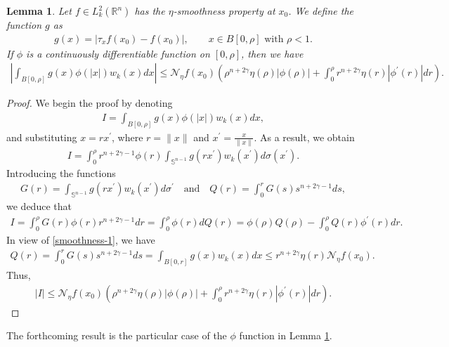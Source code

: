 \documentclass[11pt,a4paper,reqno]{amsproc}
\newtheorem{lemma}[theorem]{Lemma}
\theoremstyle{definition}
\theoremstyle{remark}
\numberwithin{equation}{section}
\begin{document}
\begin{lemma}\label{Lemmma-5-1}
    Let $f \in L_k^2(\mathbb{R}^n)$ has the $\eta$-smoothness property at $x_0$. We define the function $g$ as 
    \begin{align*}
        g(x)= |\tau_xf(x_0)-f(x_0)|, \quad \quad  x \in B[0, \rho] \text{  with  } \rho <1. 
    \end{align*} If $\phi$ is a continuously differentiable function on $[0, \rho]$, then we have
    \begin{align} \label{Inq-1}
       \left| \int_{B[0,\rho]} g(x)\phi(|x|)w_k(x)dx\right| \leq \mathcal{N}_{\eta}f(x_0)\left( \rho^{n+2\gamma}\eta(\rho)|\phi(\rho)|+\int_0^{\rho} r^{n+2\gamma} \eta(r)|\phi^\prime(r)|dr
       \right).
    \end{align}
\end{lemma}
\begin{proof} We begin the proof by
   denoting \begin{align*}
      I= \int_{B[0,\rho]} g(x)\phi(|x|)w_k(x)dx,
  \end{align*}  and substituting $x=rx^\prime$, where $r=\|x\|$ and $x^\prime= \frac{x}{\|x\|}$. As a result, we obtain 
  \begin{align*}
      I= \int_0^\rho r^{n+2\gamma-1} \phi(r)\int_{\mathbb{S}^{n-1}} g(rx^\prime)w_k(x^\prime)d\sigma(x^\prime).
  \end{align*} Introducing the functions
  \begin{align*}
      G(r)=\int_{\mathbb{S}^{n-1}} g(rx^\prime) w_k(x^\prime)d\sigma^\prime \quad \text{and} \quad Q(r)=\int_0^r G(s)s^{n+2\gamma-1}ds,
  \end{align*}we deduce that 
  \begin{align*}
      I= \int_0^\rho G(r)\phi(r)r^{n+2\gamma-1}dr = \int_0^\rho \phi(r)dQ(r)= \phi(\rho)Q(\rho)-\int_0^\rho Q(r)\phi^\prime(r)dr. 
  \end{align*} In view of \eqref{smoothness-1}, we have
\begin{align*}
    Q(r)= \int_0^r G(s)s^{n+2\gamma-1}ds = \int_{B[0,r]} g(x)w_k(x)dx  \leq r^{n+2\gamma }\eta(r)\mathcal{N}_\eta f(x_0).
\end{align*} Thus, 
\begin{align*}
   | I| \leq \mathcal{N}_{\eta}f(x_0)\left( \rho^{n+2\gamma}\eta(\rho)|\phi(\rho)|+\int_0^{\rho} r^{n+2\gamma} \eta(r)|\phi^\prime(r)|dr
       \right).
\end{align*}
\end{proof}
The forthcoming result is the particular case of the $\phi$ function in Lemma \ref{Lemmma-5-1}.
\end{document}
